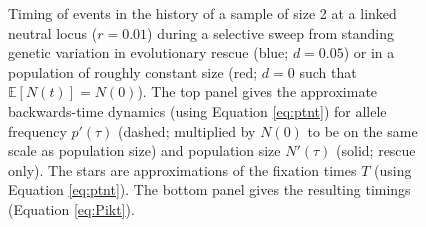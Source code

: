 \documentclass[]{article}
\begin{document}
\begin{figure}[htbp]
\caption{
Timing of events in the history of a sample of size 2 at a linked neutral locus ($r=0.01$) during a selective sweep from standing genetic variation in evolutionary rescue (blue; $d=0.05$) or in a population of roughly constant size (red; $d=0$ such that $\mathbb{E}[N(t)]=N(0)$).
The top panel gives the approximate backwards-time dynamics (using Equation \ref{eq:ptnt}) for allele frequency $p'(\tau)$ (dashed; multiplied by $N(0)$ to be on the same scale as population size) and population size $N'(\tau)$ (solid; rescue only).
The stars are approximations of the fixation times $T$ (using Equation \ref{eq:ptnt}).
The bottom panel gives the resulting timings (Equation \ref{eq:Pikt}).
}%
\label{fig:rescueSGV_timing}
\end{figure}
\end{document}
